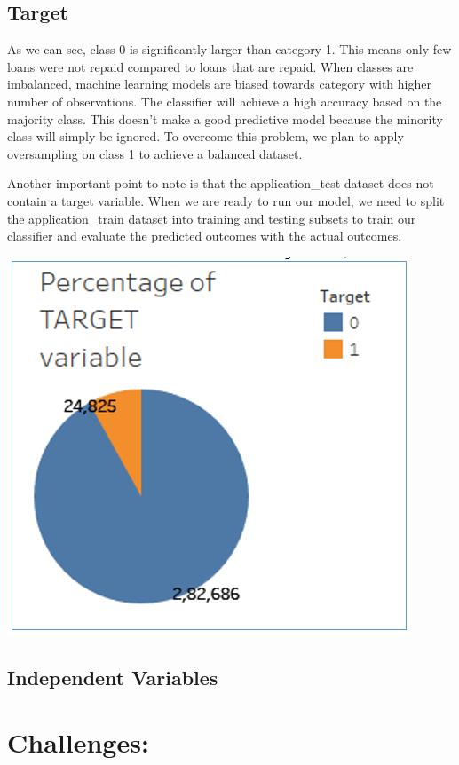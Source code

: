 \documentclass[]{book}
\begin{document}
\hypertarget{target}{%
\section{Target}\label{target}}

As we can see, class 0 is significantly larger than category 1. This means only few loans were not repaid compared to loans that are repaid. When classes are imbalanced, machine learning models are biased towards category with higher number of observations. The classifier will achieve a high accuracy based on the majority class. This doesn't make a good predictive model because the minority class will simply be ignored. To overcome this problem, we plan to apply oversampling on class 1 to achieve a balanced dataset.

Another important point to note is that the application\_test dataset does not contain a target variable. When we are ready to run our model, we need to split the application\_train dataset into training and testing subsets to train our classifier and evaluate the predicted outcomes with the actual outcomes.

\includegraphics{Images/target_dist.png}

\hypertarget{independent-variables}{%
\section{Independent Variables}\label{independent-variables}}

\hypertarget{challenges}{%
\chapter{Challenges:}\label{challenges}}
\end{document}

